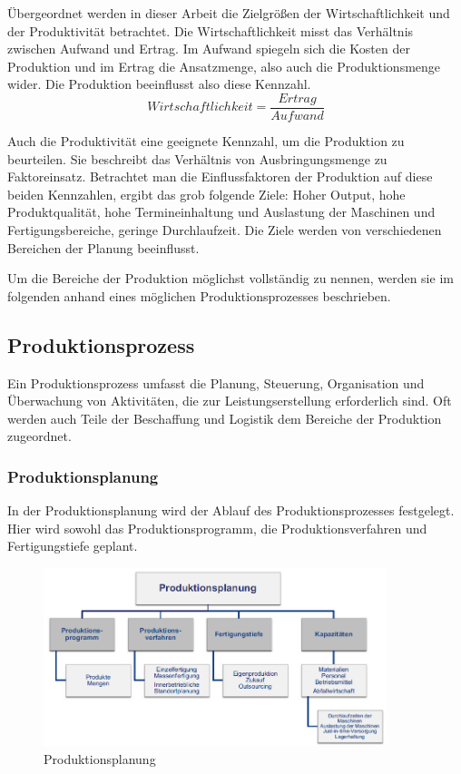 \documentclass[a4paper,12pt, german]{report}
\begin{document}
Übergeordnet werden in dieser Arbeit die Zielgrößen der Wirtschaftlichkeit und der Produktivität betrachtet. Die Wirtschaftlichkeit misst das Verhältnis zwischen Aufwand und Ertrag. Im Aufwand spiegeln sich die Kosten der Produktion und im Ertrag die Ansatzmenge, also auch die Produktionsmenge wider. Die Produktion beeinflusst also diese Kennzahl.
\begin{equation}
  Wirtschaftlichkeit =\frac{Ertrag}{Aufwand}
\end{equation}

Auch die Produktivität eine geeignete Kennzahl, um die Produktion zu beurteilen. Sie beschreibt das Verhältnis von Ausbringungsmenge zu Faktoreinsatz. Betrachtet man die Einflussfaktoren der Produktion auf diese beiden Kennzahlen, ergibt das grob folgende Ziele: Hoher Output, hohe Produktqualität, hohe Termineinhaltung und Auslastung der Maschinen und Fertigungsbereiche, geringe Durchlaufzeit. Die Ziele werden von verschiedenen Bereichen der Planung beeinflusst.

Um die Bereiche der Produktion möglichst vollständig zu nennen, werden sie im folgenden anhand eines möglichen Produktionsprozesses beschrieben. 

\subsection{Produktionsprozess}

Ein Produktionsprozess umfasst die Planung, Steuerung, Organisation und Überwachung von Aktivitäten, die zur Leistungserstellung erforderlich sind. 
Oft werden auch Teile der Beschaffung und Logistik dem Bereiche der Produktion zugeordnet. 

\subsubsection{Produktionsplanung}

In der Produktionsplanung wird der Ablauf des Produktionsprozesses festgelegt. Hier wird sowohl das Produktionsprogramm, die Produktionsverfahren und Fertigungstiefe geplant.

\begin{figure}[H]
  \center
 \includegraphics[width=10cm]{images/Produktionsplanung.png}
  \caption[Produktionsplanung]{Produktionsplanung \cite{07}}
\end{figure}
\end{document}
